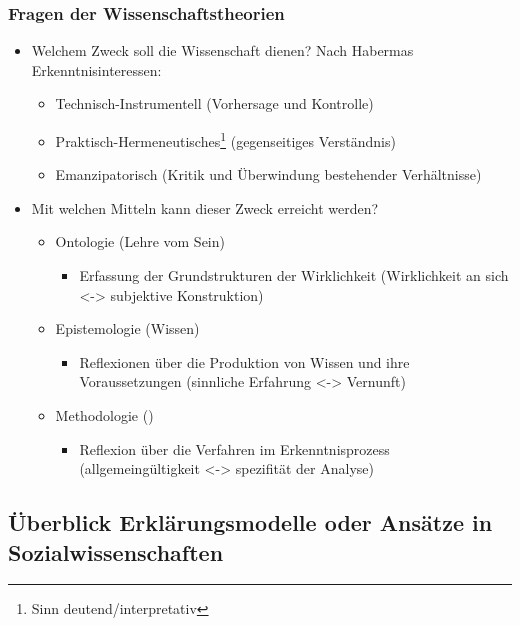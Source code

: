 \subsubsection{Fragen der Wissenschaftstheorien}
\begin{itemize}
    \item Welchem Zweck soll die Wissenschaft dienen? Nach Habermas Erkenntnisinteressen:
    \begin{itemize}
        \item Technisch-Instrumentell (Vorhersage und Kontrolle)
        \item Praktisch-Hermeneutisches\footnote{Sinn deutend/interpretativ} (gegenseitiges Verständnis)
        \item Emanzipatorisch (Kritik und Überwindung bestehender Verhältnisse)
    \end{itemize}
    \item Mit welchen Mitteln kann dieser Zweck erreicht werden? 
    \begin{itemize}
        \item Ontologie (Lehre vom Sein)
        \begin{itemize}
            \item Erfassung der Grundstrukturen der Wirklichkeit (Wirklichkeit an sich <-> subjektive Konstruktion)
        \end{itemize}
        \item Epistemologie (Wissen)
        \begin{itemize}
            \item Reflexionen über die Produktion von Wissen und ihre Voraussetzungen (sinnliche Erfahrung <-> Vernunft)
        \end{itemize}
        \item Methodologie ()
        \begin{itemize}
            \item Reflexion über die Verfahren im Erkenntnisprozess (allgemeingültigkeit <-> spezifität der Analyse)
        \end{itemize}
    \end{itemize}
    
\end{itemize}
\subsection{Überblick Erklärungsmodelle oder Ansätze in Sozialwissenschaften}

